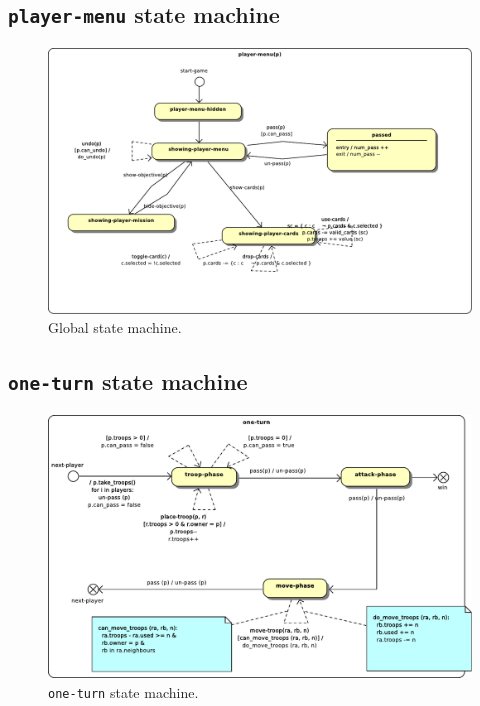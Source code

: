 \documentclass[12pt,a4paper]{article}
\begin{document}
\subsection{\texttt{player-menu} state machine}
\begin{figure}[H]
  \centering
  \includegraphics[width=15cm]{pic/5.pdf}
  \caption{Global state machine.}
  \label{fig:sm:player-menu}
\end{figure}

\subsection{\texttt{one-turn} state machine}
\begin{figure}[H]
  \centering
  \includegraphics[width=15cm]{pic/6.pdf}
  \caption{\texttt{one-turn} state machine.}
  \label{fig:sm:one-turn}
\end{figure}
\end{document}
